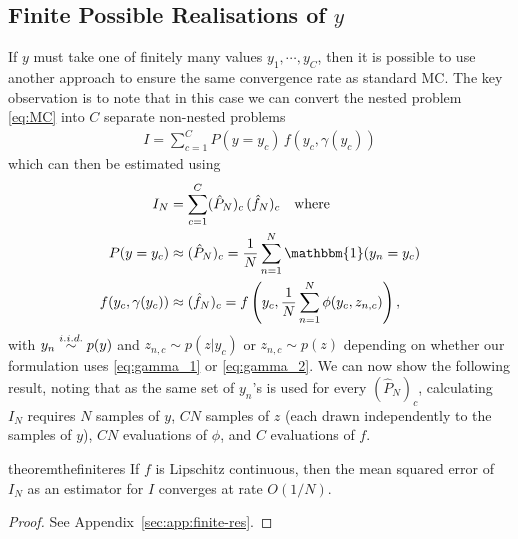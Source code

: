 
\subsection{Finite Possible Realisations of $y$}
\label{sec:discrete}

If $y$ must take one of finitely many values $y_1, \cdots, y_C$, then it is possible to
use another approach to ensure the same convergence rate as standard MC.
The key observation is to note that in this case we can convert the nested problem
\eqref{eq:MC} into $C$ separate non-nested problems
\begin{align}
         I = \sum_{c=1}^C P(y = y_c) \, f(y_c, \gamma(y_c))
\end{align}
which can then be estimated using
\begin{align}
        I_N  &= \sum_{c=1}^C (\hat{P}_N)_c \, (\hat{f}_N)_c \quad \text{where}
        \label{eq:IN} \\
        \label{eq:PN}
        P(y = y_c) &\approx (\hat{P}_N)_c = \frac{1}{N} \sum_{n=1}^N \mathbbm{1}(y_n = y_c)  \\
        \label{eq:fn}
        f(y_c, \gamma(y_c)) &\approx (\hat{f}_N)_c = f\left(y_c, \frac{1}{N} \sum_{n=1}^N \phi(y_c, z_{n,c})\right),
\end{align}
with $y_n \overset{i.i.d.}{\sim} p(y)$ and $z_{n,c} \sim p(z|y_c)$ or $z_{n,c} \sim p(z)$  
depending on whether our formulation uses
\eqref{eq:gamma_1} or \eqref{eq:gamma_2}.  
We can now show the following result, noting that as the same set of $y_n$'s is used for every
$(\hat{P}_N)_c$, calculating $I_N$ requires $N$ samples of $y$, 
$CN$ samples of $z$ (each
drawn independently to the samples of $y$), $CN$ evaluations of $\phi$, and $C$ evaluations of $f$.
\begin{restatable}{theorem}{thefiniteres}
	\label{the:finite-res}
  If $f$ is Lipschitz continuous, then the mean squared error of $I_N$ as an estimator for $I$ converges at rate $O(1/N)$.
\end{restatable}
\begin{proof}
	See Appendix~\ref{sec:app:finite-res}.
\end{proof}
%
%
